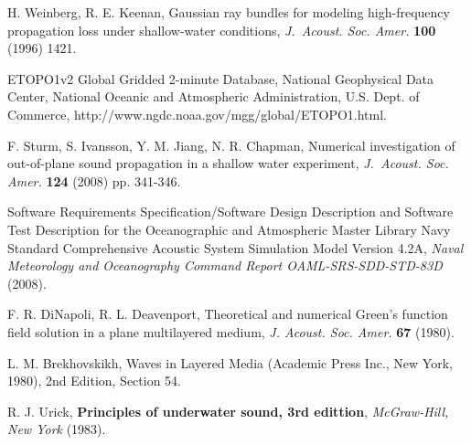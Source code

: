 \documentclass{ws-jca}
\begin{document}
\begin{thebibliography}{0}
 H. Weinberg, R. E. Keenan, Gaussian ray bundles for
modeling high-frequency propagation loss under shallow-water conditions,
{\it J.~Acoust. Soc. Amer.} {\bf 100} (1996) 1421.

 ETOPO1v2 Global Gridded 2-minute Database, National
Geophysical Data Center, National Oceanic and Atmospheric Administration,
U.S. Dept. of Commerce, http://www.ngdc.noaa.gov/mgg/global/ETOPO1.html.

 F. Sturm, S. Ivansson, Y. M. Jiang, N. R. Chapman,
Numerical investigation of out-of-plane sound propagation in a shallow
water experiment, {\it J.~Acoust. Soc. Amer.} {\bf 124} (2008) pp. 341-346.

 Software Requirements Specification/Software Design
Description and Software Test Description for the Oceanographic and
Atmospheric Master Library Navy Standard Comprehensive Acoustic System
Simulation Model Version 4.2A, {\it Naval Meteorology and Oceanography
Command Report OAML-SRS-SDD-STD-83D} (2008).

 F. R. DiNapoli, R. L. Deavenport, Theoretical and
numerical Green's function field solution in a plane multilayered medium,
{\it J. Acoust. Soc. Amer.} {\bf 67} (1980).

 L. M. Brekhovskikh, Waves in Layered Media
(Academic Press Inc., New York, 1980), 2nd Edition, Section 54.

 R. J. Urick, {\bf Principles of underwater sound, 3rd
edittion}, {\it McGraw-Hill, New York} (1983).

\end{thebibliography}
\end{document}
